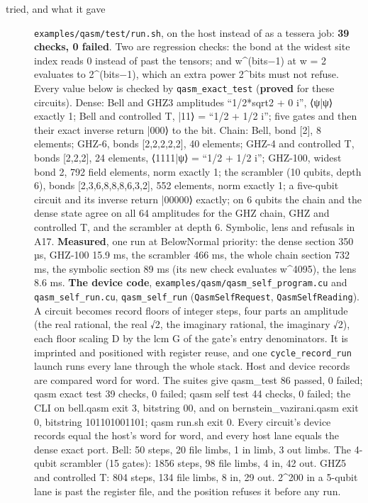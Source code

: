 \begin{description}
\item[{tried, and what it gave}] \texttt{examples/\allowbreak{}qasm/\allowbreak{}test/\allowbreak{}run.\allowbreak{}sh}, on the host instead of as a tessera job: \textbf{39 checks, 0 failed}. Two are regression checks: the bond at the widest site index reads 0 instead of past the tensors; and w\textasciicircum{}(bits−1) at w = 2 evaluates to 2\textasciicircum{}(bits−1), which an extra power 2\textasciicircum{}bits must not refuse. Every value below is checked by \texttt{qasm\_\allowbreak{}exact\_\allowbreak{}test} (\textbf{proved} for these circuits). Dense: Bell and GHZ3 amplitudes “1/2*sqrt2 + 0 i”, ⟨ψ|ψ⟩ exactly 1; Bell and controlled T, |11⟩ = “1/2 + 1/2 i”; five gates and then their exact inverse return |000⟩ to the bit. Chain: Bell, bond [2], 8 elements; GHZ-6, bonds [2,2,2,2,2], 40 elements; GHZ-4 and controlled T, bonds [2,2,2], 24 elements, ⟨1111|ψ⟩ = “1/2 + 1/2 i”; GHZ-100, widest bond 2, 792 field elements, norm exactly 1; the scrambler (10 qubits, depth 6), bonds [2,3,6,8,8,8,6,3,2], 552 elements, norm exactly 1; a five-qubit circuit and its inverse return |00000⟩ exactly; on 6 qubits the chain and the dense state agree on all 64 amplitudes for the GHZ chain, GHZ and controlled T, and the scrambler at depth 6. Symbolic, lens and refusals in A17. \textbf{Measured}, one run at BelowNormal priority: the dense section 350 µs, GHZ-100 15.9 ms, the scrambler 466 ms, the whole chain section 732 ms, the symbolic section 89 ms (its new check evaluates w\textasciicircum{}4095), the lens 8.6 ms. \textbf{The device code}, \texttt{examples/\allowbreak{}qasm/\allowbreak{}qasm\_\allowbreak{}self\_\allowbreak{}program.\allowbreak{}cu} and \texttt{qasm\_\allowbreak{}self\_\allowbreak{}run.\allowbreak{}cu}, \texttt{qasm\_\allowbreak{}self\_\allowbreak{}run} (\texttt{Qasm\allowbreak{}Self\allowbreak{}Request}, \texttt{Qasm\allowbreak{}Self\allowbreak{}Reading}). A circuit becomes record floors of integer steps, four parts an amplitude (the real rational, the real √2, the imaginary rational, the imaginary √2), each floor scaling D by the lcm G of the gate's entry denominators. It is imprinted and positioned with register reuse, and one \texttt{cycle\_\allowbreak{}record\_\allowbreak{}run} launch runs every lane through the whole stack. Host and device records are compared word for word. The suites give qasm\_\allowbreak{}test 86 passed, 0 failed; qasm exact test 39 checks, 0 failed; qasm self test 44 checks, 0 failed; the CLI on bell.qasm exit 3, bitstring 00, and on bernstein\_\allowbreak{}vazirani.qasm exit 0, bitstring 101101001101; qasm run.sh exit 0. Every circuit's device records equal the host's word for word, and every host lane equals the dense exact port. Bell: 50 steps, 20 file limbs, 1 in limb, 3 out limbs. The 4-qubit scrambler (15 gates): 1856 steps, 98 file limbs, 4 in, 42 out. GHZ5 and controlled T: 804 steps, 134 file limbs, 8 in, 29 out. 2\textasciicircum{}200 in a 5-qubit lane is past the register file, and the position refuses it before any run.

\end{description}

